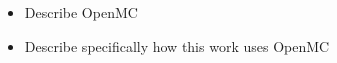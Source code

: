 \begin{itemize}
    \item Describe OpenMC
    \item Describe specifically how this work uses OpenMC
\end{itemize}